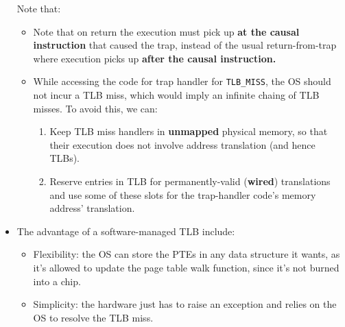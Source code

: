 \documentclass[10pt]{report}
\begin{document}
\begin{itemize}
Note that:
\begin{itemize}
    \item Note that on return the execution must pick up \textbf{at the causal instruction} that caused the trap, instead of the usual return-from-trap where execution picks up \textbf{after the causal instruction.}
    \item While accessing the code for trap handler for \texttt{TLB\_MISS}, the OS should not incur a TLB miss, which would imply an infinite chaing of TLB misses. To avoid this, we can:
    \begin{enumerate}
        \item Keep TLB miss handlers in \textbf{unmapped} physical memory, so that their execution does not involve address translation (and hence TLBs).
        \item Reserve entries in TLB for permanently-valid (\textbf{wired}) translations and use some of these slots for the trap-handler code's memory address' translation.
    \end{enumerate}
\end{itemize}
\item The advantage of a software-managed TLB include:
\begin{itemize}
    \item Flexibility: the OS 
    can store the PTEs in any data structure it wants, as it's 
    allowed to update the page table walk function, since it's not 
    burned into a chip.
    \item Simplicity: the hardware just has to raise an exception and relies on the OS to resolve the TLB miss. 
\end{itemize} 
\end{itemize}
\end{document}
